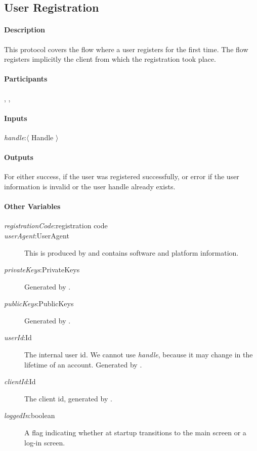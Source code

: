 \documentclass[a4paper,10pt,draft]{article}
\newcommand{\handle}{\emph{handle}}
\newcommand{\registrationCode}{\emph{registrationCode}}
\newcommand{\userAgent}{\emph{userAgent}}
\newcommand{\privateKeys}{\emph{privateKeys}}
\newcommand{\publicKeys}{\emph{publicKeys}}
\newcommand{\userId}{\emph{userId}}
\newcommand{\clientId}{\emph{clientId}}
\newcommand{\loggedIn}{\emph{loggedIn}}
\begin{document}
\subsection{User Registration}

\paragraph{Description}
This protocol covers the flow where a user registers for the first time. The flow registers implicitly the client from which the registration took place.

\paragraph{Participants} \Server{}, \Client{}, \User{}

\paragraph{Inputs}
\SpecialItem
\begin{description}
 \item[\handle{}:$\langle$ Handle $\rangle$]
\end{description}

\paragraph{Outputs}
For \Client{} either success, if the user was registered successfully, or error if the user information is invalid or the user handle already exists.

\paragraph{Other Variables}
\SpecialItem
\begin{description}
 \item[\registrationCode{}:registration code]
 \item[\userAgent{}:UserAgent] This is produced by \Client{} and contains software and platform information.
 \item[\privateKeys{}:PrivateKeys] Generated by \Client{}.
 \item[\publicKeys{}:PublicKeys] Generated by \Client{}.
 \item[\userId{}:Id] The internal user id. We cannot use \handle{}, because it may change in the lifetime of an account. Generated by \Server{}.
 \item[\clientId{}:Id] The client id, generated by \Server{}.
 \item[\loggedIn{}:boolean] A flag indicating whether at \Client{} startup \Client{} transitions to the main screen or a log-in screen.
\end{description}
\end{document}
